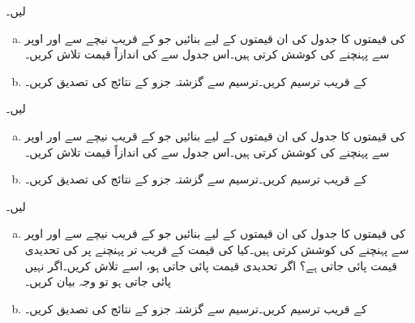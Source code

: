  لیں۔
\begin{enumerate}[a.]
\item
{} کی قیمتوں کا جدول  کی ان قیمتوں کے لیے بنائیں جو   کے قریب نیچے سے اور اوپر سے پہنچنے کی کوشش کرتی ہیں۔اس جدول سے   کی اندازاً قیمت تلاش کریں۔  
\item
{} کے قریب  ترسیم کریں۔ترسیم سے گزشتہ جزو کے نتائج کی تصدیق کریں۔
\end{enumerate}
 لیں۔
\begin{enumerate}[a.]
\item
{} کی قیمتوں کا جدول  کی ان قیمتوں کے لیے بنائیں جو    کے قریب  نیچے سے اور اوپر سے پہنچنے کی کوشش کرتی ہیں۔اس جدول سے
  کی اندازاً قیمت تلاش کریں۔  
\item
{} کے قریب  ترسیم کریں۔ترسیم سے گزشتہ جزو کے نتائج کی تصدیق کریں۔
\end{enumerate}
 لیں۔
\begin{enumerate}[a.]
\item
{} کی قیمتوں کا جدول  کی ان قیمتوں کے لیے بنائیں جو  کے قریب  نیچے سے اور اوپر سے پہنچنے کی کوشش کرتی ہیں۔کیا  کی قیمت    کے قریب تر  پہنچنے پر   کی  تحدیدی  قیمت  پائی جاتی ہے؟ اگر تحدیدی قیمت پائی جاتی ہو، اسے تلاش کریں۔اگر نہیں پائی جاتی ہو تو وجہ بیان کریں۔
\item
{} کے قریب  ترسیم کریں۔ترسیم سے گزشتہ جزو کے نتائج کی تصدیق کریں۔
\end{enumerate}
